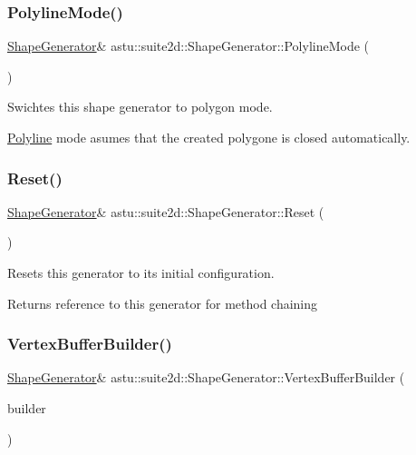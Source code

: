 \subsubsection{\texorpdfstring{Polyline\+Mode()}{PolylineMode()}}
{\footnotesize\ttfamily \hyperlink{classastu_1_1suite2d_1_1ShapeGenerator}{Shape\+Generator}\& astu\+::suite2d\+::\+Shape\+Generator\+::\+Polyline\+Mode (\begin{DoxyParamCaption}{ }\end{DoxyParamCaption})\hspace{0.3cm}{\ttfamily [inline]}}

Swichtes this shape generator to polygon mode.

\hyperlink{classastu_1_1suite2d_1_1Polyline}{Polyline} mode asumes that the created polygone is closed automatically. \mbox{\label{classastu_1_1suite2d_1_1ShapeGenerator_ac34af94d641b17d67e6fa08ead679d84}} 
\subsubsection{\texorpdfstring{Reset()}{Reset()}}
{\footnotesize\ttfamily \hyperlink{classastu_1_1suite2d_1_1ShapeGenerator}{Shape\+Generator}\& astu\+::suite2d\+::\+Shape\+Generator\+::\+Reset (\begin{DoxyParamCaption}{ }\end{DoxyParamCaption})}

Resets this generator to its initial configuration.

\begin{DoxyReturn}{Returns}
reference to this generator for method chaining 
\end{DoxyReturn}
\mbox{\label{classastu_1_1suite2d_1_1ShapeGenerator_abbc75734a94b70f5be3db4cc1829494a}} 
\subsubsection{\texorpdfstring{Vertex\+Buffer\+Builder()}{VertexBufferBuilder()}}
{\footnotesize\ttfamily \hyperlink{classastu_1_1suite2d_1_1ShapeGenerator}{Shape\+Generator}\& astu\+::suite2d\+::\+Shape\+Generator\+::\+Vertex\+Buffer\+Builder (\begin{DoxyParamCaption}\item[{std\+::shared\+\_\+ptr$<$ \hyperlink{group__gfx__group_ga45033e159deced790d4dc3968ad8e878}{Vertex\+Buffer\+Builder2f} $>$}]{builder }\end{DoxyParamCaption})}

